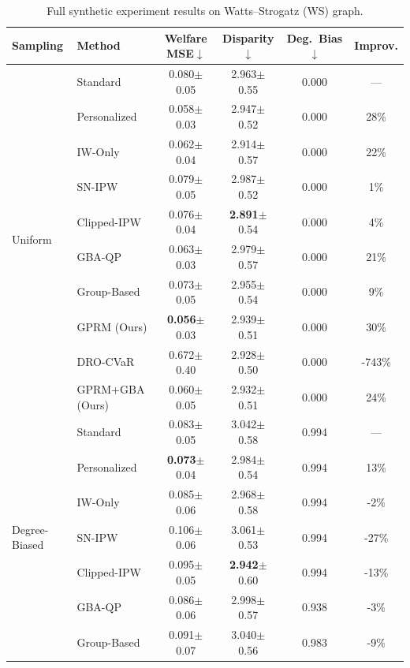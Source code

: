 \documentclass{article}
\theoremstyle{plain}
\theoremstyle{definition}
\theoremstyle{remark}
\begin{document}
\begin{table}[h]
\caption{Full synthetic experiment results on Watts--Strogatz (WS) graph.}
\label{tab:ws-full-results}
\centering\small
\begin{tabular}{llcccc}
\toprule
\textbf{Sampling} & \textbf{Method} & \textbf{Welfare MSE}$\downarrow$ & \textbf{Disparity}$\downarrow$ & \textbf{Deg.\ Bias}$\downarrow$ & \textbf{Improv.} \\
\midrule
\multirow{10}{*}{Uniform}
& Standard & 0.080{\tiny$\pm$0.05} & 2.963{\tiny$\pm$0.55} & 0.000 & --- \\
& Personalized & 0.058{\tiny$\pm$0.03} & 2.947{\tiny$\pm$0.52} & 0.000 & 28\% \\
& IW-Only & 0.062{\tiny$\pm$0.04} & 2.914{\tiny$\pm$0.57} & 0.000 & 22\% \\
& SN-IPW & 0.079{\tiny$\pm$0.05} & 2.987{\tiny$\pm$0.52} & 0.000 & 1\% \\
& Clipped-IPW & 0.076{\tiny$\pm$0.04} & \textbf{2.891}{\tiny$\pm$0.54} & 0.000 & 4\% \\
& GBA-QP & 0.063{\tiny$\pm$0.03} & 2.979{\tiny$\pm$0.57} & 0.000 & 21\% \\
& Group-Based & 0.073{\tiny$\pm$0.05} & 2.955{\tiny$\pm$0.54} & 0.000 & 9\% \\
& GPRM (Ours) & \textbf{0.056}{\tiny$\pm$0.03} & 2.939{\tiny$\pm$0.51} & 0.000 & 30\% \\
& DRO-CVaR & 0.672{\tiny$\pm$0.40} & 2.928{\tiny$\pm$0.50} & 0.000 & -743\% \\
& GPRM+GBA (Ours) & 0.060{\tiny$\pm$0.05} & 2.932{\tiny$\pm$0.51} & 0.000 & 24\% \\
\midrule
\multirow{10}{*}{Degree-Biased}
& Standard & 0.083{\tiny$\pm$0.05} & 3.042{\tiny$\pm$0.58} & 0.994 & --- \\
& Personalized & \textbf{0.073}{\tiny$\pm$0.04} & 2.984{\tiny$\pm$0.54} & 0.994 & 13\% \\
& IW-Only & 0.085{\tiny$\pm$0.06} & 2.968{\tiny$\pm$0.58} & 0.994 & -2\% \\
& SN-IPW & 0.106{\tiny$\pm$0.06} & 3.061{\tiny$\pm$0.53} & 0.994 & -27\% \\
& Clipped-IPW & 0.095{\tiny$\pm$0.05} & \textbf{2.942}{\tiny$\pm$0.60} & 0.994 & -13\% \\
& GBA-QP & 0.086{\tiny$\pm$0.06} & 2.998{\tiny$\pm$0.57} & 0.938 & -3\% \\
& Group-Based & 0.091{\tiny$\pm$0.07} & 3.040{\tiny$\pm$0.56} & 0.983 & -9\% \\

\end{tabular}
\end{table}
\end{document}

